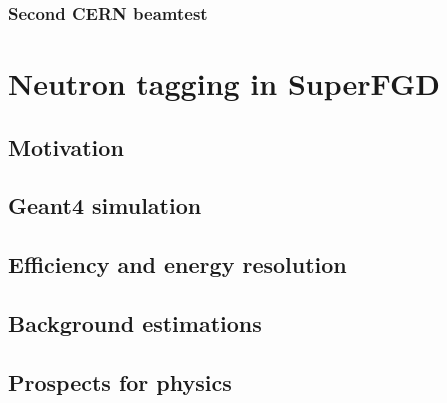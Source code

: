 \documentclass[../main.tex]{subfiles}
\begin{document}
\subsection{Second CERN beamtest}

\chapter{Neutron tagging in SuperFGD}
\label{ch:up:neutron}
\section{Motivation}
\section{Geant4 simulation}
\section{Efficiency and energy resolution}
\section{Background estimations}
\section{Prospects for physics}
\end{document}
